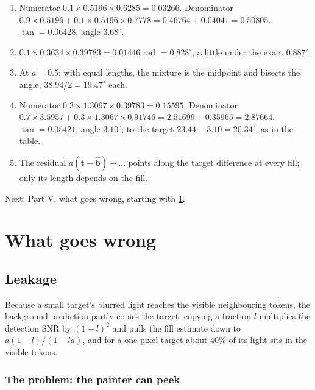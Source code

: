 \documentclass[11pt,a4paper,oneside,openany]{book}
\newcommand{\B}[1]{{\symbf{#1}}}
\newcommand{\B}[1]{{\bm{#1}}}
\newcommand{\vt}{\B{t}}
\newcommand{\vbh}{\hat{\B{b}}}
\newcommand{\nextchapter}[1]{\par\medskip\noindent\hfill\textsf{\small Next: #1}\par}
\begin{document}
\begin{answers}
\begin{enumerate}
\item Numerator $0.1\times0.5196\times0.6285=0.03266$. Denominator $0.9\times0.5196+0.1\times0.5196\times0.7778=0.46764+0.04041=0.50805$. $\tan=0.06428$,
  angle $3.68^\circ$.
\item $0.1\times0.3634\times0.39783=0.01446$ rad $=0.828^\circ$, a little under the exact $0.887^\circ$.
\item At $a=0.5$: with equal lengths, the mixture is the midpoint and bisects the angle, $38.94/2=19.47^\circ$ each.
\item Numerator $0.3\times1.3067\times0.39783=0.15595$. Denominator $0.7\times3.5957+0.3\times1.3067\times0.91746=2.51699+0.35965=2.87664$.
  $\tan=0.05421$, angle $3.10^\circ$; to the target $23.44-3.10=20.34^\circ$, as in the table.
\item The residual $a(\vt-\vbh)+\dots$ points along the target difference at every fill; only its length depends on the fill.
\end{enumerate}
\end{answers}

\nextchapter{Part V, what goes wrong, starting with \cref{ch:leak}.}
\part{What goes wrong}
\label{part:wrong}

\chapter{Leakage}
\label{ch:leak}

\begin{onething}
Because a small target's blurred light reaches the visible neighbouring tokens, the background prediction partly copies the target; copying a
fraction $l$ multiplies the detection SNR by $(1-l)^2$ and pulls the fill estimate down to $a(1-l)/(1-la)$, and for a one-pixel target about
40\% of its light sits in the visible tokens.
\end{onething}

\section{The problem: the painter can peek}
\end{document}
